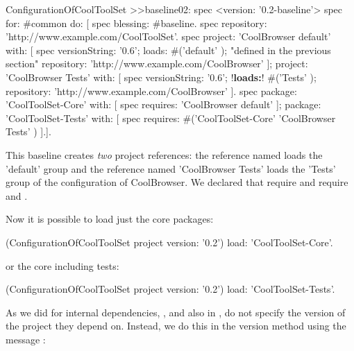\documentclass[a4paper,10pt,twoside]{book}
\begin{document}

\begin{code}{}
ConfigurationOfCoolToolSet >>baseline02: spec 
       <version: '0.2-baseline'>
       spec for: #common do: [
              spec blessing: #baseline.
              spec repository: 'http://www.example.com/CoolToolSet'.
              spec project: 'CoolBrowser default' with: [
                            spec
                                   versionString: '0.6';
                                   loads: #('default' );  "defined in the previous section"
                                   repository: 'http://www.example.com/CoolBrowser' ];
                     project: 'CoolBrowser Tests' with: [
                            spec
                                   versionString: '0.6';
                                   !\textbf{loads:}! #('Tests' );
                                   repository: 'http://www.example.com/CoolBrowser' ].
              spec 
                     package: 'CoolToolSet-Core' with: [ spec requires: 'CoolBrowser default' ];
                     package: 'CoolToolSet-Tests' with: [ 
                            spec requires: #('CoolToolSet-Core'  'CoolBrowser Tests'  ) ].].                     
\end{code}



This baseline creates \emph{two} project references: the reference named  loads the 'default' group and the reference named 'CoolBrowser Tests'  loads the 'Tests' group of the configuration of CoolBrowser. We declared that  require  and  require \mbox{} and .

Now it is possible to load just the core packages:

\begin{code}{}
(ConfigurationOfCoolToolSet project version: '0.2') load: 'CoolToolSet-Core'.
\end{code}

\noindent
or the core including tests:
\begin{code}{}
  (ConfigurationOfCoolToolSet project version: '0.2') load: 'CoolToolSet-Tests'.
\end{code}



As we did for internal dependencies, , and also in , do not specify the version of the project they depend on. Instead, we do this in the version method using the message : 
\end{document}
